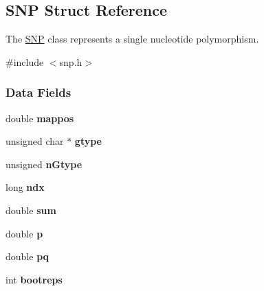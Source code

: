 \hypertarget{struct_s_n_p}{\subsection{\-S\-N\-P \-Struct \-Reference}
\label{struct_s_n_p}
}


\-The \hyperlink{struct_s_n_p}{\-S\-N\-P} class represents a single nucleotide polymorphism.  




{\ttfamily \#include $<$snp.\-h$>$}

\subsubsection*{\-Data \-Fields}
\begin{DoxyCompactItemize}
\item 
\hypertarget{struct_s_n_p_aec7eb36eb6444bfb7df1b391d747ce71}{double {\bfseries mappos}}\label{struct_s_n_p_aec7eb36eb6444bfb7df1b391d747ce71}

\item 
\hypertarget{struct_s_n_p_a00141789e67b0c10869c6819b23ec2f2}{unsigned char $\ast$ {\bfseries gtype}}\label{struct_s_n_p_a00141789e67b0c10869c6819b23ec2f2}

\item 
\hypertarget{struct_s_n_p_a70c6ef71a984f1298cfbbe45be63327b}{unsigned {\bfseries n\-Gtype}}\label{struct_s_n_p_a70c6ef71a984f1298cfbbe45be63327b}

\item 
\hypertarget{struct_s_n_p_a95dc5ff135e79b4e52ffaad88561243e}{long {\bfseries ndx}}\label{struct_s_n_p_a95dc5ff135e79b4e52ffaad88561243e}

\item 
\hypertarget{struct_s_n_p_acf65db88b6c92c66c30d982b1523966d}{double {\bfseries sum}}\label{struct_s_n_p_acf65db88b6c92c66c30d982b1523966d}

\item 
\hypertarget{struct_s_n_p_a8c1daf7780eb08d784602e86599228c6}{double {\bfseries p}}\label{struct_s_n_p_a8c1daf7780eb08d784602e86599228c6}

\item 
\hypertarget{struct_s_n_p_a2ef58af52fedfc79a2113af55dce5d9e}{double {\bfseries pq}}\label{struct_s_n_p_a2ef58af52fedfc79a2113af55dce5d9e}

\item 
\hypertarget{struct_s_n_p_a0c38be723606fdd53b15b38e21c7a754}{int {\bfseries bootreps}}\label{struct_s_n_p_a0c38be723606fdd53b15b38e21c7a754}


\end{DoxyCompactItemize}
